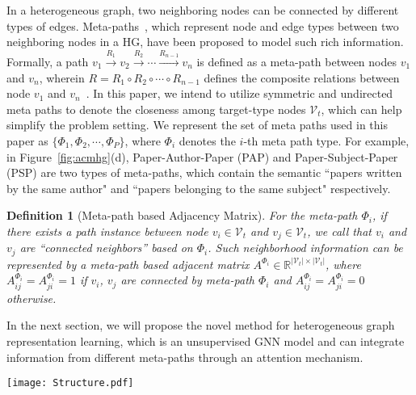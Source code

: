 \documentclass[conference]{IEEEtran}
\newtheorem{defn}{Definition}[section]\usepackage[ruled]{algorithm2e}
\begin{document}
	In a heterogeneous graph, two neighboring nodes can be connected by different types of edges. Meta-paths~\cite{SHYYW11}, which represent node and edge types between two neighboring nodes in a HG, have been proposed to model such rich information.  
Formally, a path $v_1 \xrightarrow{R_1} v_2 \xrightarrow{R_2} \cdots \xrightarrow{R_{n-1}} v_n$
	is defined as a meta-path between nodes $v_1$ and $v_n$, wherein $R = R_1 \circ R_2 \circ \cdots \circ R_{n-1}$ defines the composite relations between node $v_1$ and $v_n$~\cite{DCS17}.
	In this paper, we intend to utilize symmetric and undirected meta paths to denote the closeness among target-type nodes $\mathcal{V}_t$, which can help simplify the problem setting. We represent the set of meta paths used in this paper as $\{\Phi_1, \Phi_2, \cdots, \Phi_P\}$, where $\Phi_i$ denotes the $i$-th meta path type. For example, in Figure~\ref{fig:acmhg}(d), Paper-Author-Paper (PAP) and Paper-Subject-Paper (PSP) are two types of meta-paths, which contain the semantic ``papers written by the same author" and ``papers belonging to the same subject" respectively.
\noindent
	\begin{defn}[Meta-path based Adjacency Matrix]
		For the meta-path $\Phi_i$, if there exists a path instance between node $v_i \in \mathcal{V}_t$ and $v_j \in \mathcal{V}_t$, we call that $v_i$ and $v_j$ are ``connected neighbors'' based on $\Phi_i$. Such neighborhood information can be represented by a meta-path based adjacent matrix $A^{\Phi_i} \in \mathbb{R}^{|\mathcal{V}_t|\times |\mathcal{V}_t|}$, where $A_{ij}^{\Phi_i}=A_{ji}^{\Phi_i}=1$ if $v_i$, $v_j$ are connected by meta-path $\Phi_i$ and $A_{ij}^{\Phi_i}=A_{ji}^{\Phi_i}=0$ otherwise.
	\end{defn}




	In the next section, we will propose the novel method {\our} for heterogeneous graph representation learning, which is an unsupervised GNN model and can integrate information from different meta-paths through an attention mechanism.
	
\begin{figure*}[t]
		\centering
\texttt{[image: Structure.pdf]}
\captionsetup{singlelinecheck = false, format= hang, justification=raggedright, font=normalsize, labelsep=space}
		\caption{The high-level structure of {\our}. \textbf{(a)} Local representation encoder is a hierarchical structure: learning node representations in terms of every meta-path based adjacency matrix respectively and then aggregating them through semantic-level attention. \textbf{(b)} Global representation encoder $\mathcal{R}$ outputs a graph-level summary vector $\vec{s}$. \textbf{(c)} Negative samples generator $\mathcal{C}$ is responsible for generating negative nodes. \textbf{(d)} The discriminator $\mathcal{D}$ maximizes mutual information between positive nodes and the graph-level summary.}
		\label{fig:framework}
		
\end{figure*}
\end{document}
